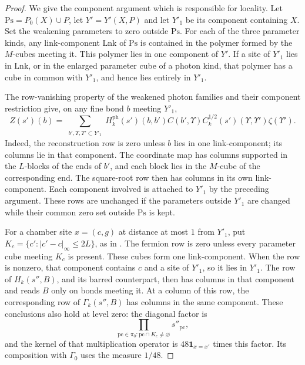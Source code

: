 \begin{proof}
We give the component argument which is responsible for
locality. Let $\mathrm{Ps}=P_0(X)\cup P$, let
$Y'=Y'(X,P)$ and let $Y'_1$ be its component containing $X$.
Set the weakening parameters to zero outside $\mathrm{Ps}$.
For each of the three parameter kinds, any link-component
$\mathrm{Lnk}$ of $\mathrm{Ps}$ is contained in the polymer
formed by the $M$-cubes meeting it. This polymer lies in one
component of $Y'$. If a site of $Y'_1$ lies in $\mathrm{Lnk}$,
or in the enlarged parameter cube of a photon kind, that
polymer has a cube in common with $Y'_1$, and hence lies
entirely in $Y'_1$.

The row-vanishing property of the weakened photon families
and their component restriction give, on any fine bond $b$
meeting $Y'_1$,
\begin{equation}\label{eq:rgnl-restricted-photon}
 Z(s')(b)=
  \sum_{\substack{b',\Upsilon,\Upsilon'\subset Y'_1}}
   H_k^{\mathrm{ph}}(s')(b,b')C(b',\Upsilon)
          C_k^{1/2}(s')(\Upsilon,\Upsilon')\zeta(\Upsilon').
\end{equation}
Indeed, the reconstruction row is zero unless $b$ lies in
one link-component; its columns lie in that component.
The coordinate map has columns supported in the $L$-blocks
of the ends of $b'$, and each block lies in the $M$-cube of
the corresponding end. The square-root row then has columns
in its own link-component. Each component involved is
attached to $Y'_1$ by the preceding argument.
These rows are unchanged if the parameters outside $Y'_1$
are changed while their common zero set outside $\mathrm{Ps}$
is kept.

For a chamber site $x=(c,g)$ at distance at most $1$ from
$Y'_1$, put $K_c=\{c':|c'-c|_\infty\le2L\}$, as in
\cite[Proposition~4.1]{FermionBlockManuscript}.
The fermion row is zero unless every parameter cube
meeting $K_c$ is present. These cubes form one
link-component. When the row is nonzero, that component
contains $c$ and a site of $Y'_1$, so it lies in $Y'_1$.
The row of $H_k(s'',B)$, and its barred counterpart,
then has columns in that component and reads $B$ only on
bonds meeting it. At a column of this row, the corresponding
row of $\Gamma_k(s'',B)$ has columns in the same component.
These conclusions also hold at level zero: the diagonal
factor is
\[
 \prod_{\mathrm{pc}\in\pi_0:\mathrm{pc}\cap K_c\ne\varnothing}
                                                       s''_{\mathrm{pc}},
\]
and the kernel of that multiplication operator is
$48\mathbf1_{x=x'}$ times this factor. Its composition with
$\Gamma_0$ uses the measure $1/48$.


\end{proof}
